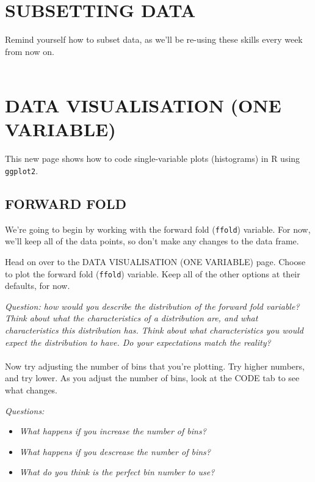 \documentclass[
]{book}
\providecommand{\tightlist}{%
  \setlength{\itemsep}{0pt}\setlength{\parskip}{0pt}}
\begin{document}
\hypertarget{subsetting-data}{%
\section{SUBSETTING DATA}\label{subsetting-data}}

Remind yourself how to subset data, as we'll be re-using these skills every week
from now on.\\
~\\

\hypertarget{data-visualisation-one-variable}{%
\section{DATA VISUALISATION (ONE VARIABLE)}\label{data-visualisation-one-variable}}

This new page shows how to code single-variable plots (histograms) in R using
\texttt{ggplot2}.\\

\hypertarget{forward-fold}{%
\subsection{FORWARD FOLD}\label{forward-fold}}

We're going to begin by working with the forward fold (\texttt{ffold}) variable. For now,
we'll keep all of the data points, so don't make any changes to the data frame.

Head on over to the DATA VISUALISATION (ONE VARIABLE) page. Choose to plot the
forward fold (\texttt{ffold}) variable. Keep all of the other options at their defaults, for now.

\emph{Question: how would you describe the distribution of the forward fold variable?
Think about what the characteristics of a distribution are, and what characteristics
this distribution has. Think about what characteristics you would expect the
distribution to have. Do your expectations match the reality?}\\
~\\

Now try adjusting the number of bins that you're plotting. Try higher numbers, and try lower.
As you adjust the number of bins, look at the CODE tab to see what changes.

\emph{Questions:}

\begin{itemize}
\tightlist
\item
  \emph{What happens if you increase the number of bins?}
\item
  \emph{What happens if you descrease the number of bins?}
\item
  \emph{What do you think is the perfect bin number to use?}\\
\end{itemize}
\end{document}
